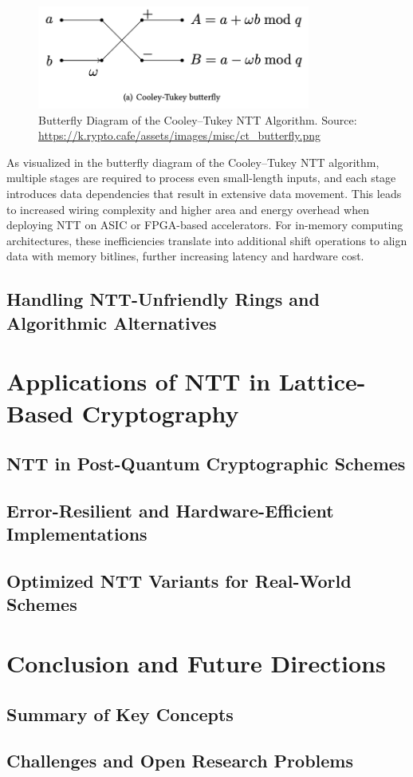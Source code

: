 \documentclass[12pt]{article}
\begin{document}
\begin{figure}[h]
    \centering
    \includegraphics[width=0.8\textwidth]{Final_img/CT_butterfly.png}
    \caption{Butterfly Diagram of the Cooley–Tukey NTT Algorithm. Source: \url{https://k.rypto.cafe/assets/images/misc/ct_butterfly.png}}
    \label{fig:butterfly}
\end{figure}

As visualized in the butterfly diagram of the Cooley–Tukey NTT algorithm, 
multiple stages are required to process even small-length inputs, 
and each stage introduces data dependencies that result in extensive data movement. 
This leads to increased wiring complexity and higher area and energy overhead when deploying NTT on ASIC or FPGA-based accelerators. 
For in-memory computing architectures, 
these inefficiencies translate into additional shift operations to align data with memory bitlines, 
further increasing latency and hardware cost.


\subsection{Handling NTT-Unfriendly Rings and Algorithmic Alternatives}

\section{Applications of NTT in Lattice-Based Cryptography}

\subsection{NTT in Post-Quantum Cryptographic Schemes}

\subsection{Error-Resilient and Hardware-Efficient Implementations}

\subsection{Optimized NTT Variants for Real-World Schemes}

\section{Conclusion and Future Directions}

\subsection{Summary of Key Concepts}

\subsection{Challenges and Open Research Problems}







 
\end{document}
